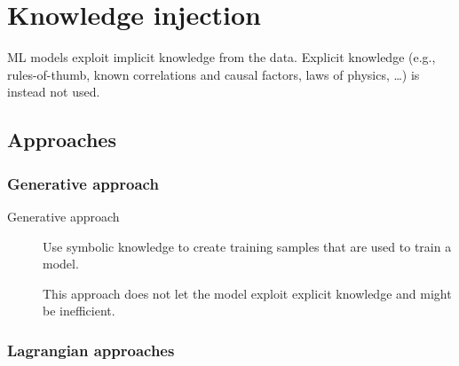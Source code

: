 \chapter{Knowledge injection}

\begin{remark}
    ML models exploit implicit knowledge from the data. Explicit knowledge (e.g., rules-of-thumb, known correlations and causal factors, laws of physics, \dots) is instead not used.
\end{remark}



\section{Approaches}


\subsection{Generative approach}

\begin{description}
    \item[Generative approach] 
        Use symbolic knowledge to create training samples that are used to train a model.

        \begin{remark}
            This approach does not let the model exploit explicit knowledge and might be inefficient.
        \end{remark}
\end{description}



\subsection{Lagrangian approaches}

